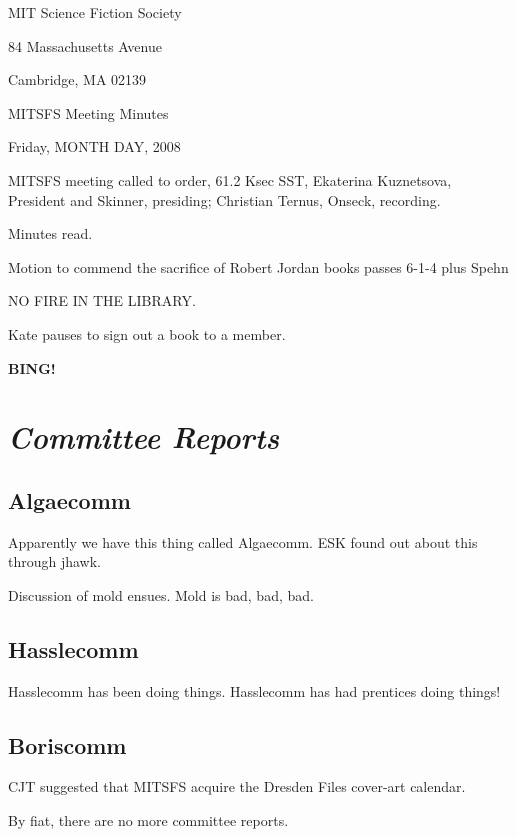 \documentclass[10pt]{article}
\newcommand{\bing}{{\bf BING!} }
\newcommand{\goto}[1]{\bing \vskip 12pt \section*{{\em{#1}}}}
\newcommand{\ps}{ plus Spehn\xspace}
\begin{document}
\begin{center}

MIT Science Fiction Society

84 Massachusetts Avenue

Cambridge, MA 02139

\vspace{12pt}

MITSFS Meeting Minutes

Friday, MONTH DAY, 2008

\end{center}

\vspace{18pt}

\setlength{\parskip}{6pt}

\noindent
MITSFS meeting called to order, 61.2 Ksec SST,
Ekaterina Kuznetsova, President and Skinner, presiding; Christian Ternus, Onseck, recording.

Minutes read.

Motion to commend the sacrifice of Robert Jordan books passes 6-1-4 \ps

NO FIRE IN THE LIBRARY.

Kate pauses to sign out a book to a member.

\BING

\goto{Committee Reports}

\subsection*{Algaecomm}

Apparently we have this thing called Algaecomm.  ESK found out about
this through jhawk.

Discussion of mold ensues.  Mold is bad, bad, bad.

\subsection*{Hasslecomm}

Hasslecomm has been doing things.  Hasslecomm has had prentices doing things!

\subsection*{Boriscomm}

CJT suggested that MITSFS acquire the Dresden Files cover-art calendar.

By fiat, there are no more committee reports.
\end{document}
